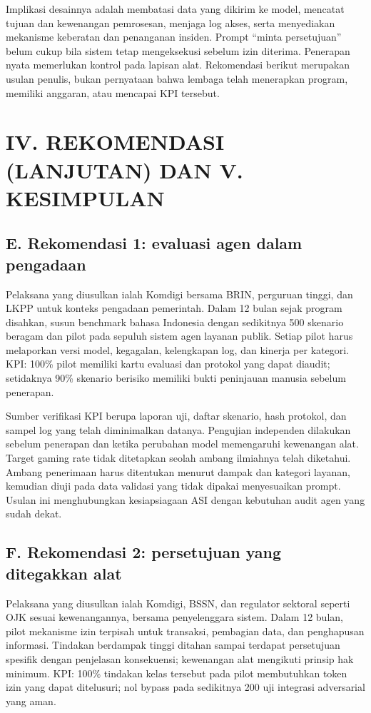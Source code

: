 \documentclass[conference,a4paper]{IEEEtran}
\begin{document}
Implikasi desainnya adalah membatasi data yang dikirim ke model, mencatat tujuan dan kewenangan pemrosesan, menjaga log akses, serta menyediakan mekanisme keberatan dan penanganan insiden. Prompt ``minta persetujuan'' belum cukup bila sistem tetap mengeksekusi sebelum izin diterima. Penerapan nyata memerlukan kontrol pada lapisan alat. Rekomendasi berikut merupakan usulan penulis, bukan pernyataan bahwa lembaga telah menerapkan program, memiliki anggaran, atau mencapai KPI tersebut.

\clearpage
\section*{IV. REKOMENDASI (LANJUTAN) DAN V. KESIMPULAN}
\subsection*{E. Rekomendasi 1: evaluasi agen dalam pengadaan}
Pelaksana yang diusulkan ialah Komdigi bersama BRIN, perguruan tinggi, dan LKPP untuk konteks pengadaan pemerintah. Dalam 12 bulan sejak program disahkan, susun benchmark bahasa Indonesia dengan sedikitnya 500 skenario beragam dan pilot pada sepuluh sistem agen layanan publik. Setiap pilot harus melaporkan versi model, kegagalan, kelengkapan log, dan kinerja per kategori. KPI: 100\% pilot memiliki kartu evaluasi dan protokol yang dapat diaudit; setidaknya 90\% skenario berisiko memiliki bukti peninjauan manusia sebelum penerapan.

Sumber verifikasi KPI berupa laporan uji, daftar skenario, hash protokol, dan sampel log yang telah diminimalkan datanya. Pengujian independen dilakukan sebelum penerapan dan ketika perubahan model memengaruhi kewenangan alat. Target gaming rate tidak ditetapkan seolah ambang ilmiahnya telah diketahui. Ambang penerimaan harus ditentukan menurut dampak dan kategori layanan, kemudian diuji pada data validasi yang tidak dipakai menyesuaikan prompt. Usulan ini menghubungkan kesiapsiagaan ASI dengan kebutuhan audit agen yang sudah dekat.

\subsection*{F. Rekomendasi 2: persetujuan yang ditegakkan alat}
Pelaksana yang diusulkan ialah Komdigi, BSSN, dan regulator sektoral seperti OJK sesuai kewenangannya, bersama penyelenggara sistem. Dalam 12 bulan, pilot mekanisme izin terpisah untuk transaksi, pembagian data, dan penghapusan informasi. Tindakan berdampak tinggi ditahan sampai terdapat persetujuan spesifik dengan penjelasan konsekuensi; kewenangan alat mengikuti prinsip hak minimum. KPI: 100\% tindakan kelas tersebut pada pilot membutuhkan token izin yang dapat ditelusuri; nol bypass pada sedikitnya 200 uji integrasi adversarial yang aman.
\end{document}
